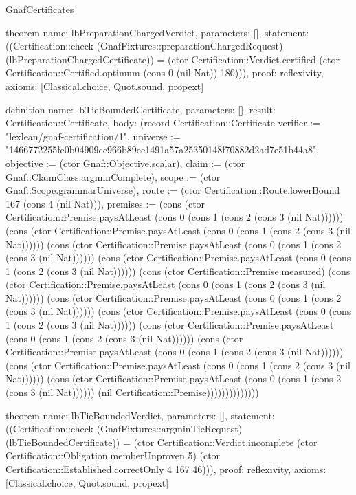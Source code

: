 \begin{lexlean}{GnafCertificates}
\begin{semanticmodule}
theorem{
  name: lbPreparationChargedVerdict,
  parameters: [],
  statement: ((Certification::check (GnafFixtures::preparationChargedRequest) (lbPreparationChargedCertificate)) = (ctor Certification::Verdict.certified (ctor Certification::Certified.optimum (cons 0 (nil Nat)) 180))),
  proof: reflexivity{},
  axioms: [Classical.choice, Quot.sound, propext]
}

definition{
  name: lbTieBoundedCertificate,
  parameters: [],
  result: Certification::Certificate,
  body: (record Certification::Certificate {verifier := "lexlean/gnaf-certification/1", universe := "1466772255fe0b04909cc966b89ee1491a57a25350148f70882d2ad7e51b44a8", objective := (ctor Gnaf::Objective.scalar), claim := (ctor Gnaf::ClaimClass.argminComplete), scope := (ctor Gnaf::Scope.grammarUniverse), route := (ctor Certification::Route.lowerBound 167 (cons 4 (nil Nat))), premises := (cons (ctor Certification::Premise.paysAtLeast (cons 0 (cons 1 (cons 2 (cons 3 (nil Nat)))))) (cons (ctor Certification::Premise.paysAtLeast (cons 0 (cons 1 (cons 2 (cons 3 (nil Nat)))))) (cons (ctor Certification::Premise.paysAtLeast (cons 0 (cons 1 (cons 2 (cons 3 (nil Nat)))))) (cons (ctor Certification::Premise.paysAtLeast (cons 0 (cons 1 (cons 2 (cons 3 (nil Nat)))))) (cons (ctor Certification::Premise.measured) (cons (ctor Certification::Premise.paysAtLeast (cons 0 (cons 1 (cons 2 (cons 3 (nil Nat)))))) (cons (ctor Certification::Premise.paysAtLeast (cons 0 (cons 1 (cons 2 (cons 3 (nil Nat)))))) (cons (ctor Certification::Premise.paysAtLeast (cons 0 (cons 1 (cons 2 (cons 3 (nil Nat)))))) (cons (ctor Certification::Premise.paysAtLeast (cons 0 (cons 1 (cons 2 (cons 3 (nil Nat)))))) (cons (ctor Certification::Premise.paysAtLeast (cons 0 (cons 1 (cons 2 (cons 3 (nil Nat)))))) (cons (ctor Certification::Premise.paysAtLeast (cons 0 (cons 1 (cons 2 (cons 3 (nil Nat)))))) (cons (ctor Certification::Premise.paysAtLeast (cons 0 (cons 1 (cons 2 (cons 3 (nil Nat)))))) (nil Certification::Premise)))))))))))))})
}

theorem{
  name: lbTieBoundedVerdict,
  parameters: [],
  statement: ((Certification::check (GnafFixtures::argminTieRequest) (lbTieBoundedCertificate)) = (ctor Certification::Verdict.incomplete (ctor Certification::Obligation.memberUnproven 5) (ctor Certification::Established.correctOnly 4 167 46))),
  proof: reflexivity{},
  axioms: [Classical.choice, Quot.sound, propext]
}


\end{semanticmodule}
\end{lexlean}
